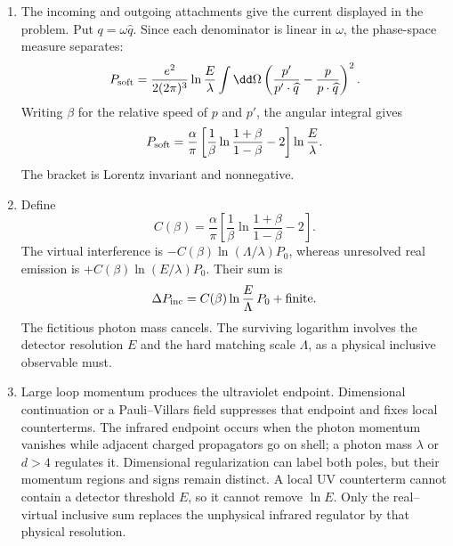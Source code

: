\begin{enumerate}
\begin{enumerate}
\item
The incoming and outgoing attachments give the current displayed in the
problem.  Put \(q=\omega\widehat q\).  Since each denominator is linear in
\(\omega\), the phase-space measure separates:
\[
 P_{\rm soft}=\frac{e^2}{2(2\pi)^3}
 \ln\frac E\lambda
 \int \dd\Omega\left(
 \frac{p'}{p'\cdot\widehat q}-\frac p{p\cdot\widehat q}\right)^2.
\]
Writing \(\beta\) for the relative speed of \(p\) and \(p'\), the angular
integral gives
\[
 P_{\rm soft}=\frac{\alpha}{\pi}
 \left[\frac1\beta\ln\frac{1+\beta}{1-\beta}-2\right]\ln\frac E\lambda .
\]
The bracket is Lorentz invariant and nonnegative.
\item
Define
\[
 C(\beta)=\frac{\alpha}{\pi}
 \left[\frac1\beta\ln\frac{1+\beta}{1-\beta}-2\right].
\]
The virtual interference is
\(-C(\beta)\ln(\Lambda/\lambda)P_0\), whereas unresolved real emission is
\(+C(\beta)\ln(E/\lambda)P_0\).  Their sum is
\[
 \Delta P_{\rm inc}=C(\beta)\ln\frac E\Lambda\,P_0+\text{finite}.
\]
The fictitious photon mass cancels.  The surviving logarithm involves the
detector resolution \(E\) and the hard matching scale \(\Lambda\), as a
physical inclusive observable must.
\item
Large loop momentum produces the ultraviolet endpoint.  Dimensional
continuation or a Pauli--Villars field suppresses that endpoint and fixes
local counterterms.  The infrared endpoint occurs when the photon momentum
vanishes while adjacent charged propagators go on shell; a photon mass
\(\lambda\) or \(d>4\) regulates it.  Dimensional regularization can label
both poles, but their momentum regions and signs remain distinct.  A local
UV counterterm cannot contain a detector threshold \(E\), so it cannot
remove \(\ln E\).  Only the real--virtual inclusive sum replaces the
unphysical infrared regulator by that physical resolution.
\end{enumerate}


\end{enumerate}
